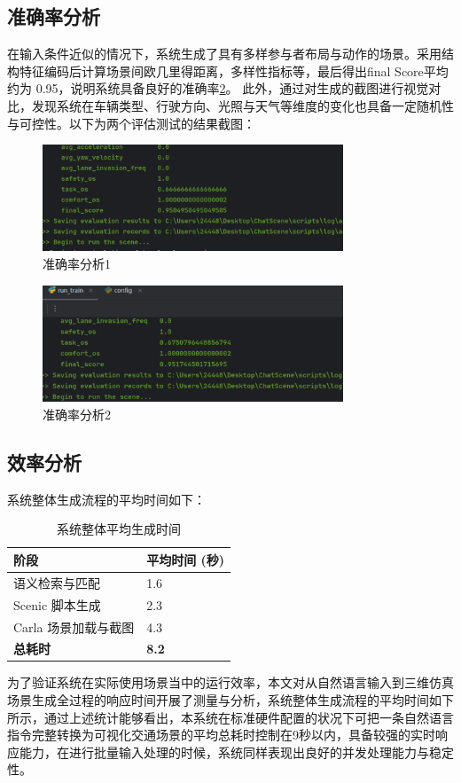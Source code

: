 \subsection{准确率分析}
在输入条件近似的情况下，系统生成了具有多样参与者布局与动作的场景。采用结构特征编码后计算场景间欧几里得距离，多样性指标等，最后得出final Score平均约为 0.95，说明系统具备良好的准确率\ref{fig:accuracy_analysis}。
此外，通过对生成的截图进行视觉对比，发现系统在车辆类型、行驶方向、光照与天气等维度的变化也具备一定随机性与可控性。以下为两个评估测试的结果截图：
\begin{figure}[H]
	\centering
	\includegraphics[width=0.8\textwidth]{"images/result2.pdf"}
	\caption{准确率分析1}
	\label{fig:accuracy_analysis}
\end{figure}

\begin{figure}[H]
	\centering
	\includegraphics[width=0.8\textwidth]{"images/result1.pdf"}
	\caption{准确率分析2}
	\label{fig:accuracy_analysis}
\end{figure}

\subsection{效率分析}
系统整体生成流程的平均时间如下：
\begin{table}[H]
	\centering
	\begin{tabular}{ll}
		\hline
		\textbf{阶段} & \textbf{平均时间 (秒)} \\
		\hline
		语义检索与匹配 & 1.6 \\
		Scenic 脚本生成 & 2.3 \\
		Carla 场景加载与截图 & 4.3 \\
		\hline
		\textbf{总耗时} & \textbf{8.2} \\
		\hline
	\end{tabular}
	\caption{系统整体平均生成时间}
	\label{tab:system_generation_time}
\end{table}
为了验证系统在实际使用场景当中的运行效率，本文对从自然语言输入到三维仿真场景生成全过程的响应时间开展了测量与分析，系统整体生成流程的平均时间如下所示，通过上述统计能够看出，本系统在标准硬件配置的状况下可把一条自然语言指令完整转换为可视化交通场景的平均总耗时控制在9秒以内，具备较强的实时响应能力，在进行批量输入处理的时候，系统同样表现出良好的并发处理能力与稳定性。

